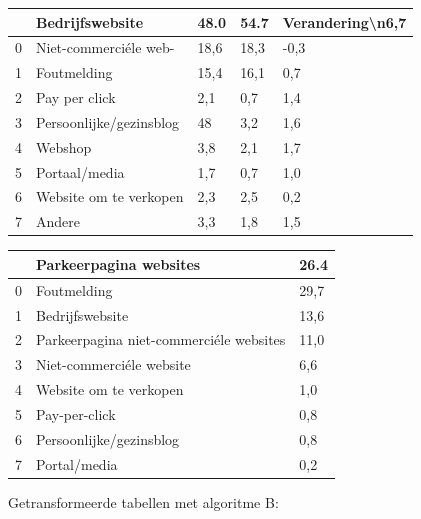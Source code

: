 \begin{tabular}{lllll}
\toprule
{} &          Bedrijfswebsite &  48.0 &  54.7 & Verandering\textbackslash n6,7 \\
\midrule
0 &    Niet-commerciéle web- &  18,6 &  18,3 &             -0,3 \\
1 &              Foutmelding &  15,4 &  16,1 &              0,7 \\
2 &            Pay per click &   2,1 &   0,7 &              1,4 \\
3 &  Persoonlijke/gezinsblog &    48 &   3,2 &              1,6 \\
4 &                  Webshop &   3,8 &   2,1 &              1,7 \\
5 &            Portaal/media &   1,7 &   0,7 &              1,0 \\
6 &   Website om te verkopen &   2,3 &   2,5 &              0,2 \\
7 &                   Andere &   3,3 &   1,8 &              1,5 \\
\bottomrule
\end{tabular}

\begin{tabular}{lll}
\toprule
{} &                   Parkeerpagina websites &  26.4 \\
\midrule
0 &                              Foutmelding &  29,7 \\
1 &                          Bedrijfswebsite &  13,6 \\
2 &  Parkeerpagina niet-commerciéle websites &  11,0 \\
3 &                 Niet-commerciéle website &   6,6 \\
4 &                   Website om te verkopen &   1,0 \\
5 &                            Pay-per-click &   0,8 \\
6 &                  Persoonlijke/gezinsblog &   0,8 \\
7 &                             Portal/media &   0,2 \\
\bottomrule
\end{tabular}

Getransformeerde tabellen met algoritme B:

